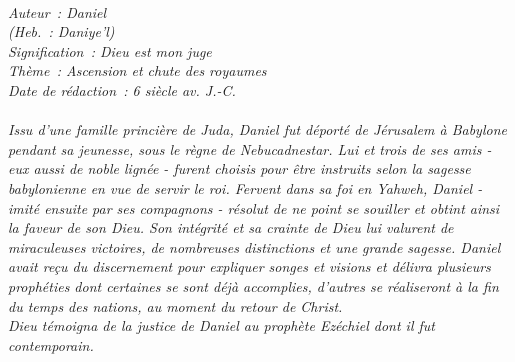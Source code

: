 \BFont
\noindent\hrulefill
{\footnotesize
\textit{
\bigskip
{\centering{}
\\Auteur~: Daniel
\\(Heb.~: Daniye'l)
\\Signification~: Dieu est mon juge
\\Thème~: Ascension et chute des royaumes
\\Date de rédaction~: 6 siècle av. J.-C.\\}
}
\textit{
\\Issu d'une famille princière de Juda, Daniel fut déporté de Jérusalem à Babylone pendant sa jeunesse, sous le règne de Nebucadnestar. Lui et trois de ses amis - eux aussi de noble lignée - furent choisis pour être instruits selon la sagesse babylonienne en vue de servir le roi. Fervent dans sa foi en Yahweh, Daniel - imité ensuite par ses compagnons - résolut de ne point se souiller et obtint ainsi la faveur de son Dieu. Son intégrité et sa crainte de Dieu lui valurent de miraculeuses victoires, de nombreuses distinctions et une grande sagesse. Daniel avait reçu du discernement pour expliquer songes et visions et délivra plusieurs prophéties dont certaines se sont déjà accomplies, d'autres se réaliseront à la fin du temps des nations, au moment du retour de Christ.
\\Dieu témoigna de la justice de Daniel au prophète Ezéchiel dont il fut contemporain.\bigskip
}
}
\par\nobreak\noindent\hrulefill
